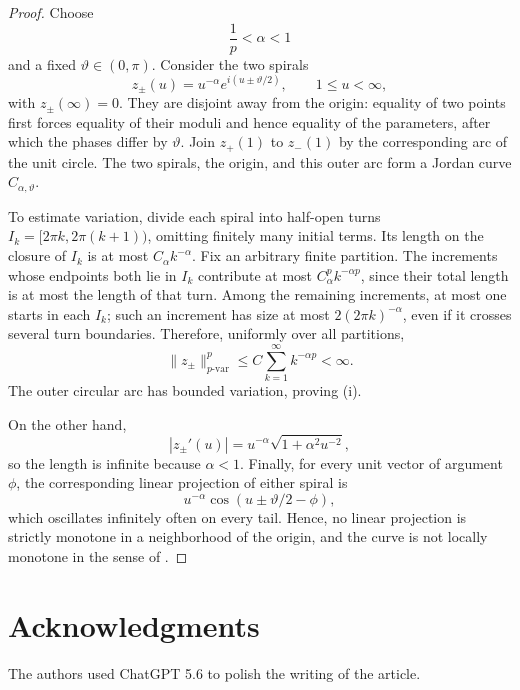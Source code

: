 \documentclass[11pt,reqno]{amsart}
\theoremstyle{definition}
\theoremstyle{remark}
\newtheorem{remark}[theorem]{Remark}
\begin{document}
\begin{proof}
Choose
\[
 \frac1p<\alpha<1
\]
and a fixed \(\vartheta\in(0,\pi)\).  Consider the two spirals
\[
 z_\pm(u)=u^{-\alpha}e^{i(u\pm\vartheta/2)},
 \qquad 1\leq u<\infty,
\]
with \(z_\pm(\infty)=0\).  They are disjoint away from the origin: equality
of two points first forces equality of their moduli and hence equality of the
parameters, after which the phases differ by \(\vartheta\).  Join
\(z_+(1)\) to \(z_-(1)\) by the corresponding arc of the unit circle.  The
two spirals, the origin, and this outer arc form a Jordan curve \(C_{\alpha,
\vartheta}\).

To estimate variation, divide each spiral into half-open turns
\(I_k=[2\pi k,2\pi(k+1))\), omitting finitely many initial terms.  Its length
on the closure of \(I_k\) is at most \(C_\alpha k^{-\alpha}\).  Fix an
arbitrary finite partition.  The increments whose endpoints both lie in
\(I_k\) contribute at most \(C_\alpha^p k^{-\alpha p}\), since their total
length is at most the length of that turn.  Among the remaining increments,
at most one starts in each \(I_k\); such an increment has size at most
\(2(2\pi k)^{-\alpha}\), even if it crosses several turn boundaries.
Therefore, uniformly over all partitions,
\[
 \lVert z_\pm\rVert_{p\text{-var}}^p
 \leq C\sum_{k=1}^\infty k^{-\alpha p}<\infty.
\]
The outer circular arc has bounded variation, proving (i).

On the other hand,
\[
 |z_\pm'(u)|
 =u^{-\alpha}\sqrt{1+\alpha^2u^{-2}},
\]
so the length is infinite because \(\alpha<1\).  Finally, for every unit
vector of argument \(\phi\), the corresponding linear projection of either
spiral is
\[
 u^{-\alpha}\cos(u\pm\vartheta/2-\phi),
\]
which oscillates infinitely often on every tail. Hence, no linear projection
is strictly monotone in a neighborhood of the origin, and the curve is not
locally monotone in the sense of \cite{Stromquist1989}.
\end{proof}

\section{Acknowledgments}
The authors used ChatGPT 5.6 to polish the writing of the article. 

\end{document}
